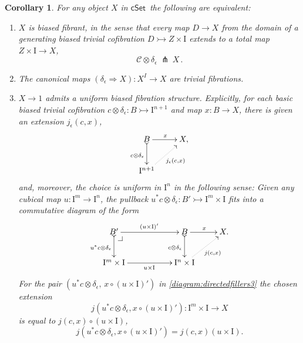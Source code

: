 \documentclass[11pt,reqno]{amsart}
\makeatletter
\newcommand{\cSet}{\ensuremath{\mathsf{cSet}}}
\newcommand{\mono}{\ensuremath{\rightarrowtail}}
\newcommand{\ra}{\ensuremath{\rightarrow}}
\renewcommand{\to}{\ensuremath{\rightarrow}}
\newcommand{\I}{\ensuremath{\mathrm{I}}}
\newtheorem{corollary}[theorem]{Corollary}
\theoremstyle{remark}
\theoremstyle{definition}
\newcommand{\pbcorner}[1][dr]{\save*!/#1-1.2pc/#1:(-1,1)@^{|-}\restore}
\makeatother
\begin{document}
\begin{corollary}\label{cor:uniformfibstructequiv}  For any object $X$ in \cSet\ the following are equivalent:
\begin{enumerate}
\item $X$ is \emph{biased fibrant}, in the sense that every map $D\to X$ from the domain of a generating biased trivial cofibration $D \mono Z \times \I$ extends to a total map $Z \times \I \ra X$,
\[
\mathcal{C}\otimes \delta_\epsilon\ \pitchfork\ X\,.
\]

\item The canonical maps $(\delta_\epsilon\Rightarrow{X}) : X^I \ra X$ are trivial fibrations.

\item $X\ra 1$ admits a \emph{uniform biased fibration structure}.  Explicitly, for each basic biased trivial cofibration $c \otimes \delta_\epsilon : B \mono \I^{n+1}$ and map $x : B\ra X$, there is given an extension $j_\epsilon(c,x)$,
\begin{equation}\label{diagram:directedfillers2.5}
\xymatrix{
B \ar@{>->}[d]_{c \otimes \delta_\epsilon} \ar[r]^{x} & X, \\
\I^{n+1}\ar@{.>}[ru]_{j_\epsilon(c,x)} &
}
\end{equation}
and, moreover,  the choice is \emph{uniform in $\I^n$} in the following sense: Given any cubical map $u : \I^m \ra \I^n$, the pullback  $u^*c \otimes \delta_\epsilon : B'\mono \I^{m}\times\I$ fits into a commutative diagram of the form
\begin{equation}\label{diagram:directedfillers3}
\xymatrix{
B' \ar@{>->}[d]_{u^*c \otimes \delta_\epsilon} \ar[rr]^{(u\times\I)'} \pbcorner &&  B \ar@{>->}[d]_{c \otimes \delta_\epsilon } \ar[r]^{x} & X. \\
\I^{m}\times\I \ar[rr]_{u\times\I } && \I^{n}\times\I \ar@{.>}[ru]_{j(c,x)} &
}
\end{equation}
For the pair $(u^*c \otimes \delta_\epsilon,\, x\circ (u\times\I)')$ in \eqref{diagram:directedfillers3} the chosen extension 
\[
j(u^*c \otimes \delta_\epsilon,x\circ (u\times\I)'): \I^m\times\I \ra X
\]
 is equal to  $j(c,x)\circ (u\times\I)$,
\begin{equation}\label{eq:uniformfillers3}
j(u^*c \otimes \delta_\epsilon,x\circ(u\times\I)') = j(c,x) (u\times\I).
\end{equation}
\end{enumerate}
\end{corollary}

\end{document}
